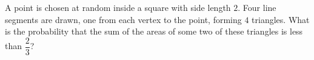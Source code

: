 A point is chosen at random inside a square with side length $2$. Four line segments are drawn, one from each vertex to the point, forming $4$ triangles. What is the probability that the sum of the areas of some two of these triangles is less than $\dfrac{2}{3}$?
